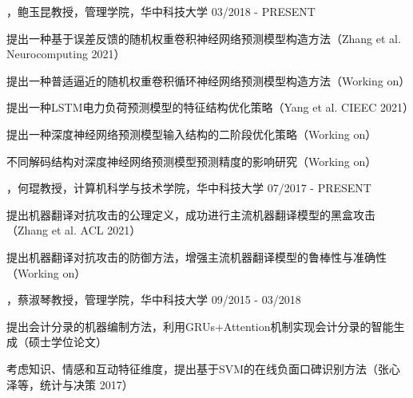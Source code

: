 
\begin{cventries}

\cvexperience
{，鲍玉昆教授，管理学院，华中科技大学}
{03/2018 - PRESENT}
{
    \begin{cvitems}
    \item {提出一种基于误差反馈的随机权重卷积神经网络预测模型构造方法（Zhang et al. Neurocomputing 2021）}
    \item {提出一种普适逼近的随机权重卷积循环神经网络预测模型构造方法（Working on）}
    \item {提出一种LSTM电力负荷预测模型的特征结构优化策略（Yang et al. CIEEC 2021）}
    \item {提出一种深度神经网络预测模型输入结构的二阶段优化策略（Working on）}
    \item {不同解码结构对深度神经网络预测模型预测精度的影响研究（Working on）}
    \end{cvitems}
}


\cvexperience
{，何琨教授，计算机科学与技术学院，华中科技大学}
{07/2017 - PRESENT}
{
    \begin{cvitems}
    \item {提出机器翻译对抗攻击的公理定义，成功进行主流机器翻译模型的黑盒攻击（Zhang et al. ACL 2021）}
    \item {提出机器翻译对抗攻击的防御方法，增强主流机器翻译模型的鲁棒性与准确性（Working on）}
    \end{cvitems}
}


\cvexperience
{，蔡淑琴教授，管理学院，华中科技大学}
{09/2015 - 03/2018}
{
    \begin{cvitems}
    \item {提出会计分录的机器编制方法，利用GRUs+Attention机制实现会计分录的智能生成（硕士学位论文）}
    \item {考虑知识、情感和互动特征维度，提出基于SVM的在线负面口碑识别方法（张心泽等，统计与决策 2017）}
    \end{cvitems}
}




\end{cventries}